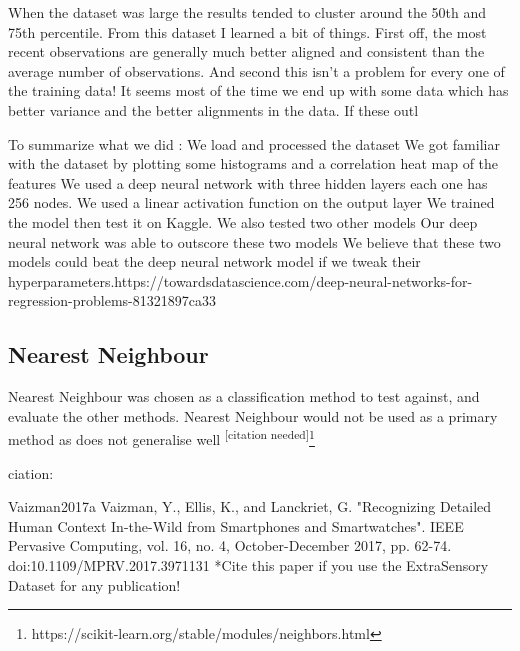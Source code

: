 \documentclass{UoNMCHA}
\newcommand{\citationneeded}{\textsuperscript{\color{blue} [citation needed]}}
\numberwithin{equation}{section}
\begin{document}
When the dataset was large the results tended to cluster around the 50th and 75th percentile. From this dataset I learned a bit of things. First off, the most recent observations are generally much better aligned and consistent than the average number of observations. And second this isn't a problem for every one of the training data! It seems most of the time we end up with some data which has better variance and the better alignments in the data. If these outl





To summarize what we did :
We load and processed the dataset
We got familiar with the dataset by plotting some histograms and a correlation heat map of the features
We used a deep neural network with three hidden layers each one has 256 nodes.
We used a linear activation function on the output layer
We trained the model then test it on Kaggle.
We also tested two other models
Our deep neural network was able to outscore these two models
We believe that these two models could beat the deep neural network model if we tweak their hyperparameters.https://towardsdatascience.com/deep-neural-networks-for-regression-problems-81321897ca33


\subsection{Nearest Neighbour}
Nearest Neighbour was chosen as a classification method to test against, and evaluate the other methods. Nearest Neighbour would not be used as a primary method as does not generalise well\citationneeded \footnote{https://scikit-learn.org/stable/modules/neighbors.html}



ciation:

Vaizman2017a	
Vaizman, Y., Ellis, K., and Lanckriet, G. "Recognizing Detailed Human Context In-the-Wild from Smartphones and Smartwatches". IEEE Pervasive Computing, vol. 16, no. 4, October-December 2017, pp. 62-74. doi:10.1109/MPRV.2017.3971131
*Cite this paper if you use the ExtraSensory Dataset for any publication!

\newpage
\end{document}
